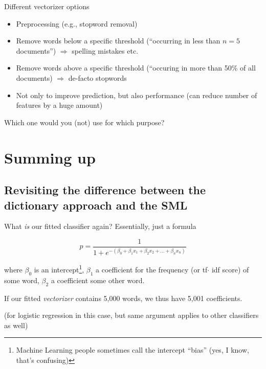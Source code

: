 \documentclass[compress]{beamer}
\begin{document}
\begin{frame}{Different vectorizer options}
	\begin{itemize}
		\item Preprocessing (e.g., stopword removal)
		\item Remove words below a specific threshold (``occurring in less than $n=5$ documents'') $\Rightarrow$ spelling mistakes etc.
		\item Remove words above a specific threshold (``occuring in more than 50\% of all documents) $\Rightarrow$ de-facto stopwords
		\item Not only to improve prediction, but also performance (can reduce number of features by a huge amount)
	\end{itemize}
\end{frame}








\begin{frame}{Which one would you (not) use for which purpose?}
	
\end{frame}




\section{Summing up}

\subsection{Revisiting the difference between the dictionary approach and the SML}


\begin{frame}{What \emph{is} our fitted classifier again?}
	Essentially, just a formula 
	
	$$p = \frac{1}{1 + e^{-(\beta_0 + \beta_1 x_1 + \beta_2 x_2 + \ldots + \beta_n x_n)}}$$
	
	where $\beta_0$ is an intercept\footnote{Machine Learning people sometimes call the intercept ``bias'' (yes, I know, that's confusing)}, $\beta_1$ a coefficient for the frequency (or tf$\cdot$ idf score) of some word, $\beta_2$ a coefficient some other word.
	
	If our fitted \emph{vectorizer} contains 5,000 words, we thus have 5,001 coefficients.
	
	\tiny{(for logistic regression in this case, but same argument applies to other classifiers as well)}
	
\end{frame}
\end{document}
